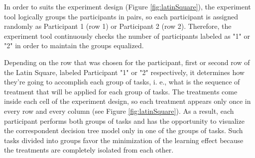  In order to suits the experiment design (Figure \ref{fig:latinSquare}), the experiment tool logically groups the participants in pairs, so each participant is assigned randomly as Participant 1 (row 1) or Participant 2 (row 2). Therefore, the experiment tool continuously checks the number of participants labeled as "1" or "2" in order to maintain the groups equalized. 

Depending on the row that was chosen for the participant, first or second row of the Latin Square, labeled Participant "1" or "2" respectively, it determines how they're going to accomplish each group of tasks, i. e., what is the sequence of treatment that will be applied for each group of tasks. The treatments come inside each cell of the experiment design, so each treatment appears only once in every row and every column (see Figure \ref{fig:latinSquare}). As a result, each participant performs both groups of tasks and has the opportunity to visualize the correspondent decision tree model only in one of the groups of tasks. Such tasks divided into groups favor the minimization of the learning effect because the treatments are completely isolated from each other.

